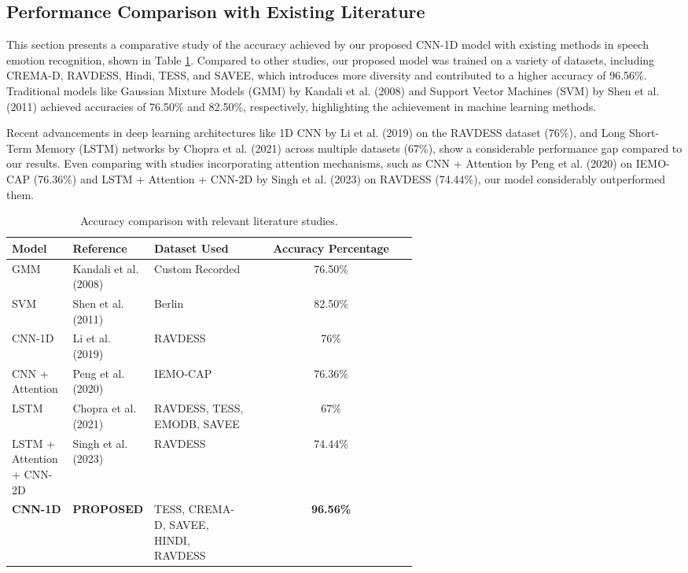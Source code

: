 \documentclass[iicol,sn-mathphys-num]{sn-jnl}%
\theoremstyle{thmstyleone}%
\theoremstyle{thmstyletwo}%
\theoremstyle{thmstylethree}%
\begin{document}
\subsection{Performance Comparison with Existing Literature}\label{subsec4.3}
This section presents a comparative study of the accuracy achieved by our proposed CNN-1D model with existing methods in speech emotion recognition, shown in Table \ref{tab:accuracy_comparison}. Compared to other studies, our proposed model was trained on a variety of datasets, including CREMA-D, RAVDESS, Hindi, TESS, and SAVEE, which introduces more diversity and contributed to a higher accuracy of 96.56\%. Traditional models like Gaussian Mixture Models (GMM) by Kandali et al. (2008) \cite{r11} and Support Vector Machines (SVM) by Shen et al. (2011) \cite{r12} achieved accuracies of 76.50\% and 82.50\%, respectively, highlighting the achievement in machine learning methods. 

Recent advancements in deep learning architectures like 1D CNN by Li et al. (2019) \cite{r13} on the RAVDESS dataset (76\%), and Long Short-Term Memory (LSTM) networks by Chopra et al. (2021) \cite{r14} across multiple datasets (67\%), show a considerable performance gap compared to our results. Even comparing with studies incorporating attention mechanisms, such as CNN + Attention by Peng et al. (2020) \cite{r15} on IEMO-CAP (76.36\%) and LSTM + Attention + CNN-2D by Singh et al. (2023) \cite{r16} on RAVDESS (74.44\%), our model considerably outperformed them.

\begin{table}[h]
\caption{Accuracy comparison with relevant literature studies.}\label{tab:accuracy_comparison}
\centering
\normalsize 
\begin{tabular}{@{} p{0.15\linewidth} | p{0.2\linewidth} | p{0.25\linewidth} | c @{}}
\toprule
\textbf{Model} & \textbf{Reference} & \textbf{Dataset Used} & \textbf{Accuracy Percentage} \\
\midrule
GMM & Kandali et al. (2008) \cite{r11} & Custom Recorded & 76.50\% \\
\addlinespace
SVM & Shen et al. (2011) \cite{r12} & Berlin & 82.50\% \\
\addlinespace
CNN-1D & Li et al. (2019) \cite{r13} & RAVDESS & 76\% \\
\addlinespace
CNN + Attention & Peng et al. (2020) \cite{r15} & IEMO-CAP & 76.36\% \\
\addlinespace
LSTM & Chopra et al. (2021) \cite{r14} & RAVDESS, TESS, EMODB, SAVEE  & 67\% \\
\addlinespace
LSTM + Attention + CNN-2D & Singh et al. (2023) \cite{r16} & RAVDESS & 74.44\% \\
\midrule
\textbf{CNN-1D} & \textbf{PROPOSED} & TESS, CREMA-D, SAVEE, HINDI, RAVDESS  & \textbf{96.56\%} \\
\bottomrule
\end{tabular}
\end{table}
\end{document}
